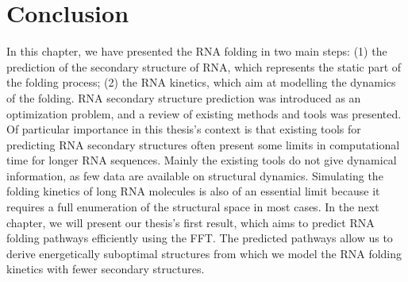 \section{Conclusion}
In this chapter, we have presented the \ac{RNA} folding in two main steps: (1) the prediction of the secondary structure of \ac{RNA}, which represents the static part of the folding process; (2) the \ac{RNA} kinetics, which aim at modelling the dynamics of the folding. \ac{RNA} secondary structure prediction was introduced as an optimization problem, and a review of existing methods and tools was presented. Of particular importance in this thesis's context is that existing tools for predicting \ac{RNA} secondary structures often present some limits in computational time for longer \ac{RNA} sequences. Mainly the existing tools do not give dynamical information, as few data are available on structural dynamics. Simulating the folding kinetics of long \ac{RNA} molecules is also of an essential limit because it requires a full enumeration of the structural space in most cases. In the next chapter, we will present our thesis's first result, which aims to predict \ac{RNA} folding pathways efficiently using the \ac{FFT}. The predicted pathways allow us to derive energetically suboptimal structures from which we model the \ac{RNA} folding kinetics with fewer secondary structures.

